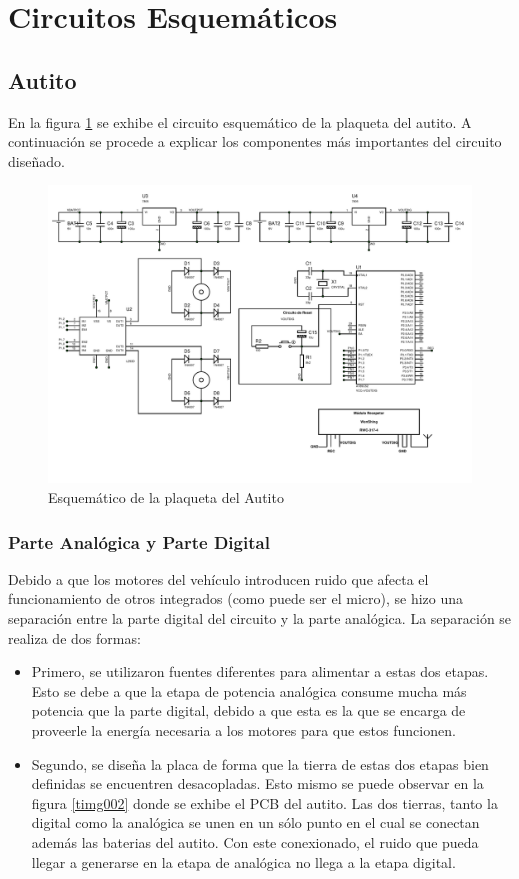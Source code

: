 \documentclass[a4paper,10pt]{article}
\begin{document}
	\section{Circuitos Esquemáticos}
		\subsection{Autito}
			En la figura \ref{timg001} se exhibe el circuito esquemático de la plaqueta del autito. A continuación se procede a explicar los componentes más 
			importantes del circuito diseñado.

			\begin{figure}[!htb]
				\centering
				\includegraphics[width=14cm]{Imagenes/EsquematicoAuto.PDF}
				\caption{Esquemático de la plaqueta del Autito} \label{timg001}
			\end{figure}

				\subsubsection{Parte Analógica y Parte Digital}
					Debido a que los motores del vehículo introducen ruido que afecta el funcionamiento de otros integrados (como puede ser el micro), se hizo una 
					separación entre la parte digital del circuito y la parte analógica. La separación se realiza de dos formas: 
			
					\begin{itemize}
						\item Primero, se utilizaron fuentes diferentes para alimentar a estas dos etapas. Esto se debe a que la etapa de potencia analógica consume
						mucha más potencia que la parte digital, debido a que esta es la que se encarga de proveerle la energía necesaria a los motores para que 
						estos funcionen.
						\item Segundo, se diseña la placa de forma que la tierra de estas dos etapas bien definidas se encuentren desacopladas. Esto mismo se puede observar
						en la figura \ref{timg002} donde se exhibe el PCB del autito. Las dos tierras, tanto la digital como la analógica se unen en un sólo punto en el 
						cual se conectan además las baterias del autito. Con este conexionado, el ruido que pueda llegar a generarse en la etapa de analógica no llega a 
						la etapa digital.    
					\end{itemize}
\end{document}
